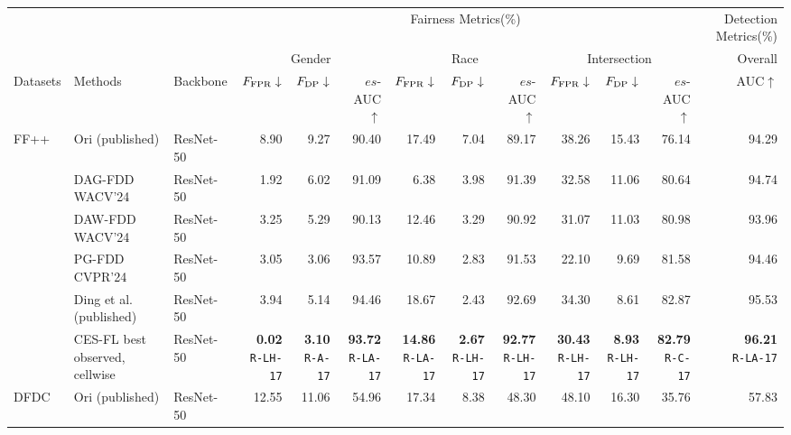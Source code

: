 \documentclass[10pt]{article}
\begin{document}
{\fontsize{8}{9.5}\selectfont\setlength{\tabcolsep}{3pt}
\renewcommand{\arraystretch}{1.05}
\begin{tabular*}{\linewidth}{@{\extracolsep{\fill}}lllrrrrrrrrrr}\toprule
 & & & \multicolumn{9}{c}{Fairness Metrics(\%)} & Detection Metrics(\%)\\
 & & & \multicolumn{3}{c}{Gender} & \multicolumn{3}{c}{Race} & \multicolumn{3}{c}{Intersection} & Overall\\
Datasets & Methods & Backbone & $F_{\rm FPR}\downarrow$ & $F_{\rm DP}\downarrow$ & $es$-AUC$\uparrow$ & $F_{\rm FPR}\downarrow$ & $F_{\rm DP}\downarrow$ & $es$-AUC$\uparrow$ & $F_{\rm FPR}\downarrow$ & $F_{\rm DP}\downarrow$ & $es$-AUC$\uparrow$ & AUC$\uparrow$\\\midrule
FF++ & Ori (published) & ResNet-50 & 8.90 & 9.27 & 90.40 & 17.49 & 7.04 & 89.17 & 38.26 & 15.43 & 76.14 & 94.29\\
 & DAG-FDD WACV'24 & ResNet-50 & 1.92 & 6.02 & 91.09 & 6.38 & 3.98 & 91.39 & 32.58 & 11.06 & 80.64 & 94.74\\
 & DAW-FDD WACV'24 & ResNet-50 & 3.25 & 5.29 & 90.13 & 12.46 & 3.29 & 90.92 & 31.07 & 11.03 & 80.98 & 93.96\\
 & PG-FDD CVPR'24 & ResNet-50 & 3.05 & 3.06 & 93.57 & 10.89 & 2.83 & 91.53 & 22.10 & 9.69 & 81.58 & 94.46\\
 & Ding et al. (published) & ResNet-50 & 3.94 & 5.14 & 94.46 & 18.67 & 2.43 & 92.69 & 34.30 & 8.61 & 82.87 & 95.53\\
\rowcolor{blue!8} & CES-FL best observed, cellwise & ResNet-50 & \shortstack{\textbf{0.02}\\{\tiny\texttt{R-LH-17}}} & \shortstack{\textbf{3.10}\\{\tiny\texttt{R-A-17}}} & \shortstack{\textbf{93.72}\\{\tiny\texttt{R-LA-17}}} & \shortstack{\textbf{14.86}\\{\tiny\texttt{R-LA-17}}} & \shortstack{\textbf{2.67}\\{\tiny\texttt{R-LH-17}}} & \shortstack{\textbf{92.77}\\{\tiny\texttt{R-LH-17}}} & \shortstack{\textbf{30.43}\\{\tiny\texttt{R-LH-17}}} & \shortstack{\textbf{8.93}\\{\tiny\texttt{R-LH-17}}} & \shortstack{\textbf{82.79}\\{\tiny\texttt{R-C-17}}} & \shortstack{\textbf{96.21}\\{\tiny\texttt{R-LA-17}}}\\
\midrule
DFDC & Ori (published) & ResNet-50 & 12.55 & 11.06 & 54.96 & 17.34 & 8.38 & 48.30 & 48.10 & 16.30 & 35.76 & 57.83\\

\end{tabular*}}
\end{document}
